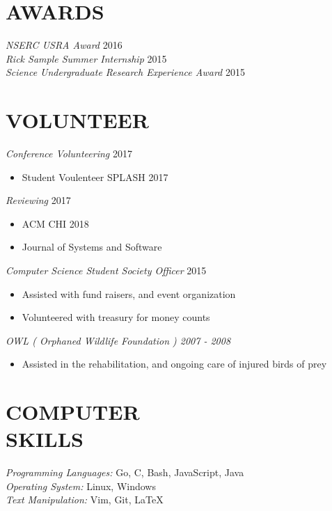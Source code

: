 \documentclass[line,margin]{res}
\begin{document}
\begin{resume}
\section{AWARDS}
{\sl NSERC USRA Award} \hfill 2016\\
{\sl Rick Sample Summer Internship} \hfill 2015\\
{\sl Science Undergraduate Research Experience Award} \hfill 2015\\


\section{VOLUNTEER}

{\sl Conference Volunteering} \hfill 2017
    \begin{itemize}
        \item Student Voulenteer SPLASH 2017
    \end{itemize}

{\sl Reviewing} \hfill 2017
    \begin{itemize}
        \item ACM CHI 2018
        \item Journal of Systems and Software
    \end{itemize}

{\sl Computer Science Student Society Officer} \hfill 2015
    \begin{itemize}
        \item Assisted with fund raisers, and event organization
        \item Volunteered with treasury for money counts
    \end{itemize}

{\sl OWL ( Orphaned Wildlife Foundation ) {\hfill 2007 - 2008}
    \begin{itemize}
         \item Assisted in the rehabilitation, and ongoing care of injured birds of prey
    \end{itemize}
}
    

\section{COMPUTER \\ SKILLS} 
	{\sl Programming Languages:} Go, C, Bash, JavaScript, Java\\
	{\sl Operating System:} Linux, Windows\\
	{\sl Text Manipulation:} Vim, Git, \LaTeX \\


\end{resume}
\end{document}
